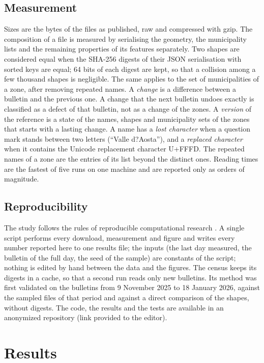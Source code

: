 \documentclass[review,authoryear,12pt]{elsarticle}
\newcommand{\repository}{an anonymized repository (link provided to the editor)}
\newcommand{\repository}{\url{https://github.com/webysther/aiodpc}}
\begin{document}
\subsection{Measurement}

Sizes are the bytes of the files as published, raw and compressed with gzip.
The composition of a file is measured by serialising the geometry, the
municipality lists and the remaining properties of its features separately.
Two shapes are considered equal when the SHA-256 digests of their JSON
serialisation with sorted keys are equal; 64 bits of each digest are kept, so
that a collision among a few thousand shapes is negligible. The same applies to
the set of municipalities of a zone, after removing repeated names. A
\emph{change} is a difference between a bulletin and the previous one. A change
that the next bulletin undoes exactly is classified as a defect of that
bulletin, not as a change of the zones. A \emph{version} of the reference is a
state of the names, shapes and municipality sets of the zones that starts with
a lasting change. A name has a \emph{lost character} when a question mark
stands between two letters (``Valle d?Aosta''), and a \emph{replaced
character} when it contains the Unicode replacement character U+FFFD. The
repeated names of a zone are the entries of its list beyond the distinct ones.
Reading times are the fastest of five runs on one machine and are reported
only as orders of magnitude.

\subsection{Reproducibility}

The study follows the rules of reproducible computational research
\citep{sandve2013,peng2011}. A single script performs every download,
measurement and figure and writes every number reported here to one results
file; the inputs (the last day measured, the bulletin of the full day, the
seed of the sample) are constants of the script; nothing is edited by hand
between the data and the figures. The census keeps its digests in a cache, so
that a second run reads only new bulletins. Its method was first validated on
the bulletins from 9 November 2025 to 18 January 2026, against the sampled
files of that period and against a direct comparison of the shapes, without
digests. The code, the results and the tests are available in
\repository{}.

\section{Results}
\label{sec:results}
\end{document}
